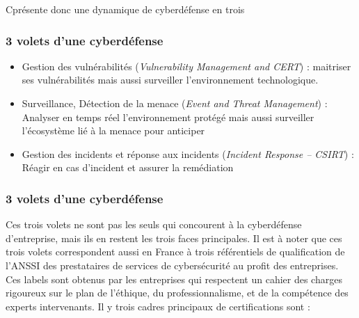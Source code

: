 C\edoc présente donc une dynamique de cyberdéfense en trois

\begin{frame}
\frametitle<presentation>{3 volets d'une cyberdéfense}


\begin{itemize}
\item Gestion des vulnérabilités (\textit{Vulnerability Management and CERT}) : maitriser ses vulnérabilités mais aussi surveiller l’environnement technologique. 
\item Surveillance, Détection de la menace (\textit{Event and Threat Management}) : Analyser en temps réel l’environnement protégé mais aussi surveiller l’écosystème lié à la menace pour anticiper 
\item Gestion des incidents et réponse aux incidents (\textit{Incident Response – CSIRT}) : Réagir en cas d’incident et assurer la remédiation
\end{itemize}

\end{frame}


\begin{frame}
\frametitle<presentation>{3 volets d'une cyberdéfense}

\end{frame}

Ces trois volets ne sont pas les seuls qui concourent à la cyberdéfense d’entreprise, mais ils en restent les trois faces principales. Il est à noter que ces trois volets correspondent aussi en France à trois référentiels de qualification de l’ANSSI des prestataires de services de cybersécurité au profit des entreprises. Ces labels sont obtenus par les entreprises qui respectent un cahier des charges rigoureux sur le plan de l'éthique, du professionnalisme, et de la compétence des experts intervenants. Il y trois cadres principaux de certifications sont :


